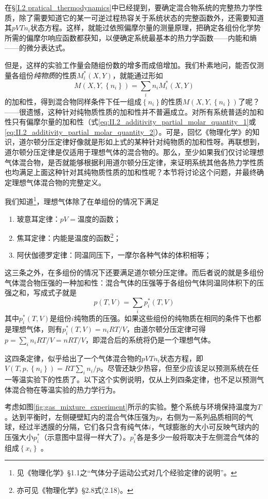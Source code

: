 \documentclass[main.tex]{subfiles}
\begin{document}
在\S\ref{I.2 pratical_thermodynamics}中已经提到，要确定混合物系统的完整热力学性质，除了需要知道它的某一可逆过程热容关于系统状态的完整函数外，还需要知道其$pVTn_i$状态方程。这样，就能过依照偏摩尔量的测量原理，把确定各组份化学势所需的偏摩尔响应函数都获知，以便确定系统最基本的热力学函数——内能和熵——的微分表达式。

但是，这样的实验工作量会随组份数的增多而成倍增加。我们朴素地问，能否仅测量各组份\emph{纯物质}的性质$M_i^*\left(X,Y\right)$，就能通过形如
\[M\left(X,Y,\left\{n_i\right\}\right)=\sum_i n_i M_i^*\left(X,Y\right)\]
的加和性，得到混合物同样条件下任一组成$\left\{n_i\right\}$的性质$M\left(X,Y,\left\{n_i\right\}\right)$了呢？——很遗憾，这种针对纯物质性质的加和性并不普遍成立。对所有系统普适的加和性只有偏摩尔量的加和性（式\eqref{eq:II.2_additivity_partial_molar_quantity_1}或\eqref{eq:II.2_additivity_partial_molar_quantity_2}）。可是，回忆《物理化学》的知识，道尔顿分压定律好像就是形如上式的某种针对纯物质的加和性呀。再联想到，道尔顿分压定律是仅适用于理想气体的混合物的。那么，至少如果我们仅讨论理想气体混合物，是否就能够根据利用道尔顿分压定律，来证明系统其他各热力学性质也均满足上面这种针对其纯物质性质的加和性呢？本节将讨论这个问题，并最终确定理想气体混合物的完整定义。

我们知道\footnote{见《物理化学》\S1.1之“气体分子运动公式对几个经验定律的说明”。}，理想气体除了在单组份的情况下满足
\begin{enumerate}
    \item 玻意耳定律：$pV=\text{温度的函数}$；
    \item 焦耳定律：内能是温度的函数\footnote{亦可见《物理化学》\S 2.8式(2.18)。}；
    \item 阿伏伽德罗定律：同温同压下，一摩尔各种气体的体积相等；
\end{enumerate}
这三条之外，在多组份的情况下还要满足道尔顿分压定律。而后者说的就是多组份气体混合物压强的一种加和性：混合气体的压强等于各组份气体同温同体积下的压强之和，写成式子就是
\[p\left(T,V\right)=\sum_i p^*_i\left(T,V\right)\]
其中$p_i^*\left(T,V\right)$是组份$i$纯物质的压强。如果这些组份的纯物质在相同的条件下也都是理想气体，则有$p_i^*\left(T,V\right)=n_iRT/V$，由道尔顿分压定律可得$p=\sum_in_iRT/V=nRT/V$，即混合后的系统将仍是一个理想气体。

这四条定律，似乎给出了一个气体混合物的$pVTn_i$状态方程，即$V\left(T,p,\left\{n_i\right\}\right)=RT\sum_in_i/p$。尽管还缺少热容，但至少应该足以预测系统在任一等温实验下的性质了。以下这个实例说明，仅从上列四条定律，也不足以预测气体混合物在等温实验的热力学行为。

考虑如图\ref{fig:gas_mixture_experiment}所示的实验。整个系统与环境保持温度为$T$。达到平衡时，左侧硬壁缸内的混合气体压强为$p$，右侧为一系列品质相同的气球，经过半透膜的分隔，它们各只含有纯气体$i$，气球膨胀的大小可反映气球内的压强大小$p^*_i$（示意图中显得一样大了）。$p^*_i$各是多少一般将取决于左侧混合气体的组成$\left\{x_i\right\}$ 。
\end{document}
